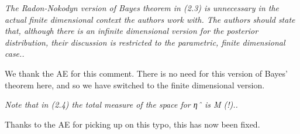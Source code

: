 \documentclass{article}
\newcommand{\comment}[2]{\vspace{0.6cm}{\bf Comment:} {\it #1.}

\vspace{0.3cm}{\bf Answer:} #2}
\begin{document}
\comment{The Radon-Nokodyn version of Bayes theorem in (2.3) is unnecessary in the actual finite dimensional context the authors work with. The authors should state that, although there is an infinite dimensional version for the posterior distribution, their discussion is restricted to the parametric, finite dimensional case.}{We thank the AE for this comment. There is no need for this version of Bayes' theorem here, and so we have switched to the finite dimensional version.}%

\comment{Note that in (2.4) the total measure of the space for ηˆ is M (!).}{Thanks to the AE for picking up on this typo, this has now been fixed.}%
\end{document}
